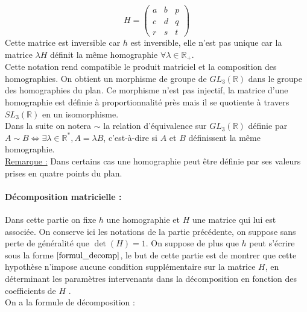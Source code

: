 	\begin{equation*}
	H=\begin{pmatrix}
	a&b&p\\c&d&q\\r&s&t
	\end{pmatrix}
	\end{equation*}
	Cette matrice est inversible car $h$ est inversible, elle n'est pas unique car la matrice $\lambda H$ définit la même homographie $\forall \lambda \in \mathbb{R}_+$.\\
Cette notation rend compatible le produit matriciel et la composition des homographies. On obtient un morphisme de groupe de $GL_{3}(\mathbb{R})$ dans le groupe des homographies du plan. Ce morphisme n'est pas injectif, la matrice d'une homographie est définie à proportionnalité près mais il se quotiente à travers $SL_{3}(\mathbb{R})$ en un isomorphisme.\\
Dans la suite on notera $\sim$ la relation d'équivalence  sur $GL_{3}(\mathbb{R})$ définie par $A\sim B \iff \exists \lambda\in \mathbb{R}^{*} , A=\lambda B$, c'est-à-dire si $A$ et $B$ définissent la même homographie.\\
\underline{Remarque :} Dans certains cas une homographie peut être définie par ses valeurs prises en quatre points du plan.\\



\paragraph{Décomposition matricielle :}

Dans cette partie on fixe $h$ une homographie et $H$ une matrice qui lui est associée. On conserve ici les notations de la partie précédente, on suppose sans perte de généralité que $\det (H)=1$. On suppose de plus que $h$ peut s'écrire sous la forme $\ref{formul_decomp}$, le but de cette partie est de montrer que cette hypothèse n'impose aucune condition supplémentaire sur la matrice $H$, en déterminant les paramètres intervenants dans la décomposition en fonction des coefficients de $H$ .\\
On a la formule de décomposition :

